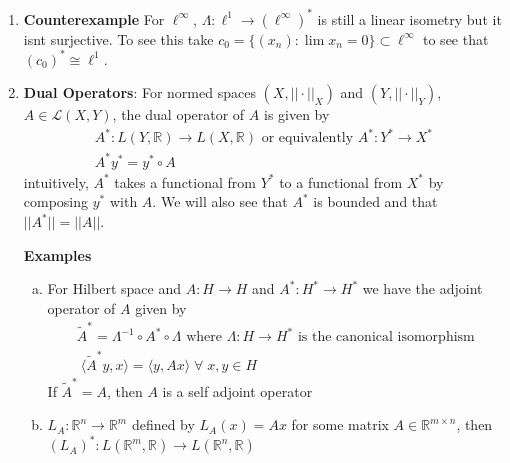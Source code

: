 \documentclass{article}
\begin{document}
\begin{enumerate}
    \item \textbf{Counterexample} For \(\ell^\infty\), \(\Lambda: \ell^1 \to (\ell^\infty)^*\) is still a linear isometry but it isnt surjective. To see this take \(c_0 = \{(x_n):\lim x_n = 0\} \subset \ell^\infty\) to see that \((c_0)^* \cong \ell^1\).

    \item \textbf{Dual Operators}: For normed spaces \((X, ||\cdot||_X)\) and \((Y, ||\cdot||_Y)\), \(A \in \mathcal{L}(X, Y)\), the dual operator of \(A\) is given by
    \begin{gather*}
    A^* : L(Y,  \mathbb{R}) \to L(X, \mathbb{R}) \text{ or equivalently }A^*:Y^* \to X^* \\A^*y^* = y^*\circ A 
    \end{gather*}
    intuitively, \(A^*\) takes a functional from \(Y^*\) to a functional from \(X^*\) by composing \(y^*\) with \(A\). We will also see that \(A^*\) is bounded and that \(||A^*|| = ||A||\). 

    \textbf{Examples}
    \begin{enumerate} [a.]
        \item For Hilbert space and \(A: H \to H\) and \(A^*:H^* \to H^*\) we have the adjoint operator of \(A\) given by
        \begin{gather*}
        \tilde A^* = \Lambda^{-1} \circ A^* \circ \Lambda \text{ where } \Lambda:H\to H^* \text{ is the canonical isomorphism}\\
        \;\langle \tilde A^*y, x\rangle= \langle y, Ax\rangle \;\forall \; x, y \in H
        \end{gather*}
        If \(\tilde A^* = A\), then \(A\) is a self adjoint operator
        \item \(L_A:\mathbb{R}^n \to \mathbb{R}^m\) defined by \(L_A(x) = Ax\) for some matrix \(A \in \mathbb{R}^{m \times n}\), then \((L_A)^*:L(\mathbb{R}^m, \mathbb{R}) \to L(\mathbb{R}^n, \mathbb{R})\)
    \end{enumerate}

\end{enumerate}
\end{document}
